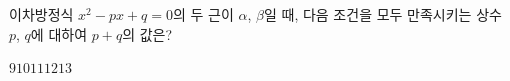 이차방정식 $x^2-px+q=0$의 두 근이 $\alpha$, $\beta$일 때, 다음 조건을 모두 만족시키는 상수 $p$, $q$에 대하여 $p+q$의 값은? 
\begin{choices32}{$9$}{$10$}{$11$}{$12$}{$13$}\end{choices32}
